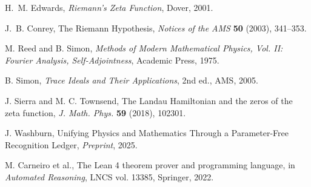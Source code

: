 \documentclass[12pt]{article}
\theoremstyle{definition}
\theoremstyle{remark}
\begin{document}
\begin{thebibliography}{1}

H.~M. Edwards,
\emph{Riemann's Zeta Function},
Dover, 2001.

J.~B. Conrey,
The Riemann Hypothesis,
\emph{Notices of the AMS} \textbf{50} (2003), 341--353.

M. Reed and B. Simon,
\emph{Methods of Modern Mathematical Physics, Vol. II: Fourier Analysis, Self-Adjointness},
Academic Press, 1975.

B. Simon,
\emph{Trace Ideals and Their Applications},
2nd ed., AMS, 2005.

J. Sierra and M. C. Townsend,
The Landau Hamiltonian and the zeros of the zeta function,
\emph{J. Math. Phys.} \textbf{59} (2018), 102301.

J. Washburn,
Unifying Physics and Mathematics Through a Parameter-Free Recognition Ledger,
\emph{Preprint}, 2025.

M. Carneiro et al.,
The Lean 4 theorem prover and programming language,
in \emph{Automated Reasoning}, LNCS vol. 13385, Springer, 2022.

\end{thebibliography}

\end{document}
